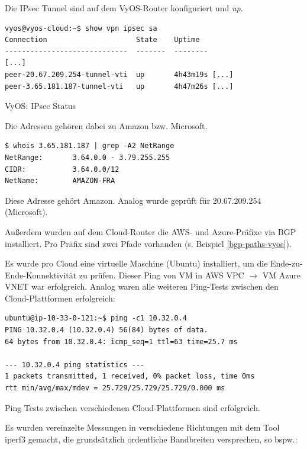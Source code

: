 Die IPsec Tunnel sind auf dem VyOS-Router konfiguriert und \textit{up}.
\begin{listing}[h]
\begin{verbatim}
vyos@vyos-cloud:~$ show vpn ipsec sa
Connection                     State    Uptime
-----------------------------  -------  --------
[...]
peer-20.67.209.254-tunnel-vti  up       4h43m19s [...]
peer-3.65.181.187-tunnel-vti   up       4h47m26s [...]

\end{verbatim}
\caption{VyOS: IPsec Status}
\label{tf-base-deployment-ipsec-ok}
\end{listing}\FloatBarrier
Die Adressen gehören dabei zu Amazon bzw. Microsoft.
\begin{listing}[h]
\begin{verbatim}
$ whois 3.65.181.187 | grep -A2 NetRange
NetRange:       3.64.0.0 - 3.79.255.255
CIDR:           3.64.0.0/12
NetName:        AMAZON-FRA

\end{verbatim}
\caption{Diese Adresse gehört Amazon. Analog wurde geprüft für 20.67.209.254 (Microsoft).}
\label{whois-amazon-public-ip}
\end{listing}
Außerdem wurden auf dem Cloud-Router die AWS- und Azure-Präfixe via BGP installiert. Pro Präfix sind zwei Pfade vorhanden (s. Beispiel \ref{bgp-paths-vyos}).

Es wurde pro Cloud eine virtuelle Maschine (Ubuntu) installiert, um die Ende-zu-Ende-Konnektivität zu prüfen. Dieser Ping von VM in AWS VPC $\rightarrow$ VM Azure VNET war erfolgreich. Analog waren alle weiteren Ping-Tests zwischen den Cloud-Plattformen erfolgreich:
\begin{listing}[h]
\begin{verbatim}
ubuntu@ip-10-33-0-121:~$ ping -c1 10.32.0.4
PING 10.32.0.4 (10.32.0.4) 56(84) bytes of data.
64 bytes from 10.32.0.4: icmp_seq=1 ttl=63 time=25.7 ms

--- 10.32.0.4 ping statistics ---
1 packets transmitted, 1 received, 0% packet loss, time 0ms
rtt min/avg/max/mdev = 25.729/25.729/25.729/0.000 ms
\end{verbatim}
\caption{Ping Tests zwischen verschiedenen Cloud-Plattformen sind erfolgreich.}
\label{tf-base-deployment-ping-ok}
\end{listing}
Es wurden vereinzelte Messungen in verschiedene Richtungen mit dem Tool \textsf{iperf3} gemacht, die grundsätzlich \glqq ordentliche\grqq{} Bandbreiten versprechen, so bspw.:


